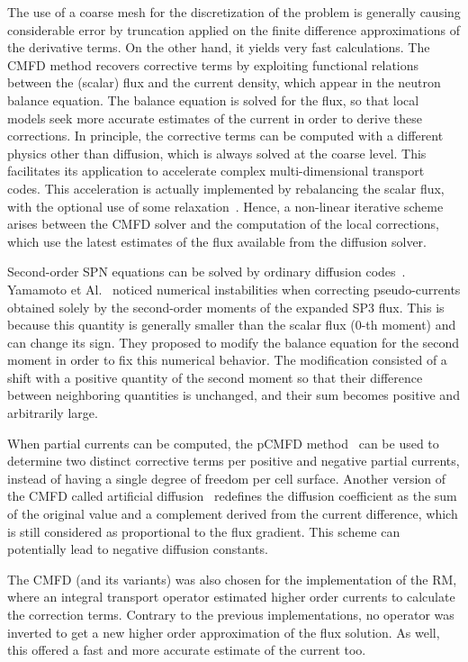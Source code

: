\documentclass[letterpaper]{physor2020}
\begin{document}
The use of a coarse mesh for the discretization of the problem is generally causing considerable error by truncation applied on the finite difference approximations of the derivative terms. On the other hand, it yields very fast calculations. The CMFD method recovers corrective terms by exploiting functional relations between the (scalar) flux and the current density, which appear in the neutron balance equation. The balance equation is solved for the flux, so that local models seek more accurate estimates of the current in order to derive these corrections. In principle, the corrective terms can be computed with a different physics other than diffusion, which is always solved at the coarse level. This facilitates its application to accelerate complex multi-dimensional transport codes. This acceleration is actually implemented by rebalancing the scalar flux, with the optional use of some relaxation~\cite{Park-2017}. Hence, a non-linear iterative scheme arises between the CMFD solver and the computation of the local corrections, which use the latest estimates of the flux available from the diffusion solver.

Second-order SPN equations can be solved by ordinary diffusion codes~\cite{Larsen-1993}. Yamamoto et Al.~\cite{Yamamoto-2016} noticed numerical instabilities when correcting pseudo-currents obtained solely by the second-order moments of the expanded SP3 flux. This is because this quantity is generally smaller than the scalar flux (0-th moment) and can change its sign. They proposed to modify the balance equation for the second moment in order to fix this numerical behavior. The modification consisted of a shift with a positive quantity of the second moment so that their difference between neighboring quantities is unchanged, and their sum becomes positive and arbitrarily large.

When partial currents can be computed, the pCMFD method~\cite{Cho-2003} can be used to determine two distinct corrective terms per positive and negative partial currents, instead of having a single degree of freedom per cell surface. Another version of the CMFD called artificial diffusion~\cite{Zhu-2016,Jarrett-2016} redefines the diffusion coefficient as the sum of the original value and a complement derived from the current difference, which is still considered as proportional to the flux gradient. This scheme can potentially lead to negative diffusion constants.

The CMFD (and its variants) was also chosen for the implementation of the RM, where an integral transport operator estimated higher order currents to calculate the correction terms. Contrary to the previous implementations, no operator was inverted to get a new higher order approximation of the flux solution. As well, this offered a fast and more accurate estimate of the current too.
\end{document}
